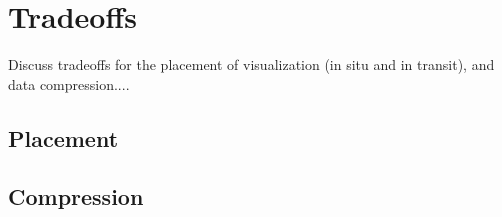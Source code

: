 \section{Tradeoffs}
Discuss tradeoffs for the placement of visualization (in situ and in transit), and data compression....

\subsection{Placement}

\subsection{Compression}
